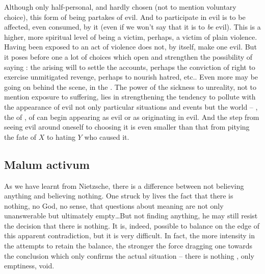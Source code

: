 \pa Although only half-personal, and hardly chosen (not to mention voluntary
choice), this form of being partakes of evil. And to participate in evil is to
be affected, even consumed, by it (even if we won't say that it is to {\em be}
evil). This is a higher, more spiritual level of being a victim, perhaps, a
victim of plain violence. Having been exposed to an act of violence does not, by
itself, make one evil. But it poses before one a lot of choices which open and
strengthen the possibility of saying \No: the arising will to settle the
accounts, perhaps the conviction of right to exercise unmitigated revenge,
perhaps to nourish hatred, etc..
%
Even more may be going on behind the scene, in the . The
 power of the sickness to unreality, not to mention exposure to
suffering, lies in strengthening the tendency to pollute with the appearance of
evil not only particular situations and events but the world -- , the  of , of 
can begin appearing as evil or as originating in evil. And the step from seeing
evil around oneself to choosing it is even smaller than that from pitying the
fate of $X$ to hating $Y$ who caused it.




\subsection{Malum activum}
\pa
As we have learnt from Nietzsche, there is a difference between not believing
anything and believing nothing.
%
One struck by  lives the fact that there is nothing, no God,
no sense, that questions about meaning are not only unanswerable but
ultimately empty\ldots But not finding anything, he may still resist the decision
that there is nothing. It is, indeed, possible to balance on the edge of this
apparent contradiction, but it is very difficult. In fact, the more intensity in the
attempts to retain the balance, the stronger the force dragging one towards the
conclusion which only confirms the actual situation -- there is nothing
, only emptiness, void. 

